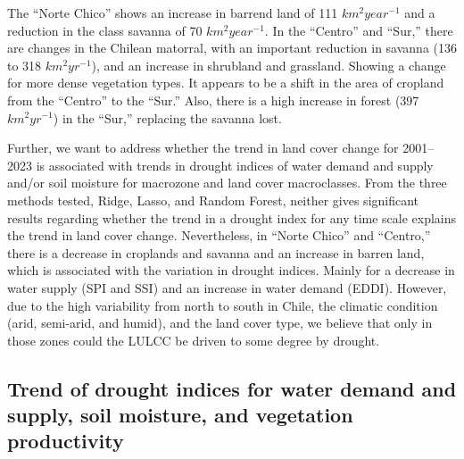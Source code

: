 \documentclass[
  authoryear,
  preprint,
  3p,
  onecolumn]{elsarticle}
\begin{document}
The ``Norte Chico'' shows an increase in barrend land of 111
\(km^2 year^{-1}\) and a reduction in the class savanna of 70
\(km^2 year^{-1}\). In the ``Centro'' and ``Sur,'' there are changes in
the Chilean matorral, with an important reduction in savanna (136 to 318
\(km^2 yr^{-1}\)), and an increase in shrubland and grassland. Showing a
change for more dense vegetation types. It appears to be a shift in the
area of cropland from the ``Centro'' to the ``Sur.'' Also, there is a
high increase in forest (397 \(km^2 yr^{-1}\)) in the ``Sur,'' replacing
the savanna lost.

Further, we want to address whether the trend in land cover change for
2001--2023 is associated with trends in drought indices of water demand
and supply and/or soil moisture for macrozone and land cover
macroclasses. From the three methods tested, Ridge, Lasso, and Random
Forest, neither gives significant results regarding whether the trend in
a drought index for any time scale explains the trend in land cover
change. Nevertheless, in ``Norte Chico'' and ``Centro,'' there is a
decrease in croplands and savanna and an increase in barren land, which
is associated with the variation in drought indices. Mainly for a
decrease in water supply (SPI and SSI) and an increase in water demand
(EDDI). However, due to the high variability from north to south in
Chile, the climatic condition (arid, semi-arid, and humid), and the land
cover type, we believe that only in those zones could the LULCC be
driven to some degree by drought.

\hypertarget{trend-of-drought-indices-for-water-demand-and-supply-soil-moisture-and-vegetation-productivity-1}{%
\subsection{Trend of drought indices for water demand and supply, soil
moisture, and vegetation
productivity}\label{trend-of-drought-indices-for-water-demand-and-supply-soil-moisture-and-vegetation-productivity-1}}
\end{document}
